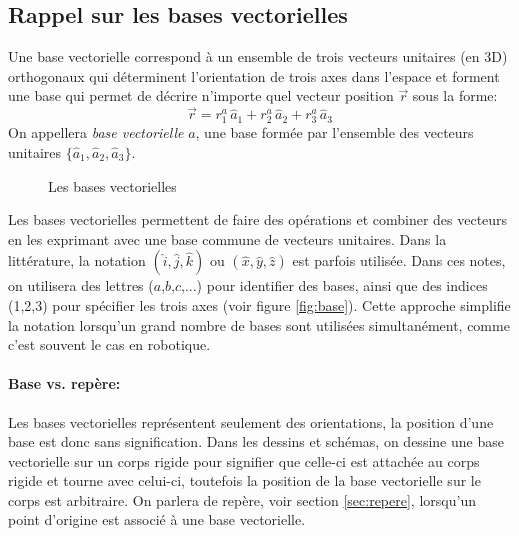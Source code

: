 \subsection{Rappel sur les bases vectorielles}
\label{vectorbasisrap}
Une base vectorielle correspond à un ensemble de trois vecteurs unitaires (en 3D) orthogonaux qui déterminent l'orientation de trois axes dans l'espace et forment une base qui permet de décrire n'importe quel vecteur position $\vec{r}$ sous la forme:
\begin{equation}
\vec{r} = r_1^a \, \hat{a}_{1} + r_2^a \, \hat{a}_{2} + r_3^a \, \hat{a}_{3}
\label{eq:vecbasisr}
\end{equation} 
On appellera \textit{base vectorielle} $a$, une base formée par l'ensemble des vecteurs unitaires $\{\hat{a}_{1},\hat{a}_{2},\hat{a}_{3}\}$.
%
\begin{figure}[htpb]
        \centering
				\hspace{10pt}
				\hspace{10pt}
        \caption{Les bases vectorielles}
				\label{fig:vecbasis}
\end{figure}

Les bases vectorielles permettent de faire des opérations et combiner des vecteurs en les exprimant avec une base commune de vecteurs unitaires. Dans la littérature, la notation $(\hat{i},\hat{j},\hat{k})$ ou $(\hat{x},\hat{y},\hat{z})$ est parfois utilisée. Dans ces notes, on utilisera des lettres ($a$,$b$,$c$,...) pour identifier des bases, ainsi que des indices (1,2,3) pour spécifier les trois axes (voir figure \ref{fig:base}). Cette approche simplifie la notation lorsqu'un grand nombre de bases sont utilisées simultanément, comme c'est souvent le cas en robotique.

\paragraph{Base vs. repère:} Les bases vectorielles représentent seulement des orientations, la position d'une base est donc sans signification. Dans les dessins et schémas, on dessine une base vectorielle sur un corps rigide pour signifier que celle-ci est attachée au corps rigide et tourne avec celui-ci, toutefois la position de la base vectorielle sur le corps est arbitraire. On parlera de repère, voir section \ref{sec:repere}, lorsqu'un point d'origine est associé à une base vectorielle. 



